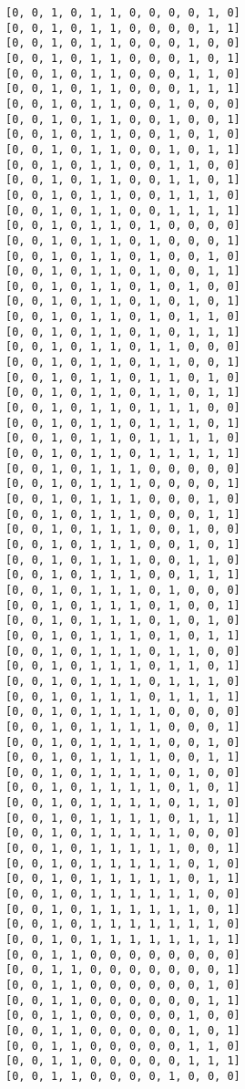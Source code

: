 \documentclass[11pt]{article}
\begin{document}
\begin{Verbatim}[commandchars=\\\{\}]
[0, 0, 1, 0, 1, 1, 0, 0, 0, 0, 1, 0]
[0, 0, 1, 0, 1, 1, 0, 0, 0, 0, 1, 1]
[0, 0, 1, 0, 1, 1, 0, 0, 0, 1, 0, 0]
[0, 0, 1, 0, 1, 1, 0, 0, 0, 1, 0, 1]
[0, 0, 1, 0, 1, 1, 0, 0, 0, 1, 1, 0]
[0, 0, 1, 0, 1, 1, 0, 0, 0, 1, 1, 1]
[0, 0, 1, 0, 1, 1, 0, 0, 1, 0, 0, 0]
[0, 0, 1, 0, 1, 1, 0, 0, 1, 0, 0, 1]
[0, 0, 1, 0, 1, 1, 0, 0, 1, 0, 1, 0]
[0, 0, 1, 0, 1, 1, 0, 0, 1, 0, 1, 1]
[0, 0, 1, 0, 1, 1, 0, 0, 1, 1, 0, 0]
[0, 0, 1, 0, 1, 1, 0, 0, 1, 1, 0, 1]
[0, 0, 1, 0, 1, 1, 0, 0, 1, 1, 1, 0]
[0, 0, 1, 0, 1, 1, 0, 0, 1, 1, 1, 1]
[0, 0, 1, 0, 1, 1, 0, 1, 0, 0, 0, 0]
[0, 0, 1, 0, 1, 1, 0, 1, 0, 0, 0, 1]
[0, 0, 1, 0, 1, 1, 0, 1, 0, 0, 1, 0]
[0, 0, 1, 0, 1, 1, 0, 1, 0, 0, 1, 1]
[0, 0, 1, 0, 1, 1, 0, 1, 0, 1, 0, 0]
[0, 0, 1, 0, 1, 1, 0, 1, 0, 1, 0, 1]
[0, 0, 1, 0, 1, 1, 0, 1, 0, 1, 1, 0]
[0, 0, 1, 0, 1, 1, 0, 1, 0, 1, 1, 1]
[0, 0, 1, 0, 1, 1, 0, 1, 1, 0, 0, 0]
[0, 0, 1, 0, 1, 1, 0, 1, 1, 0, 0, 1]
[0, 0, 1, 0, 1, 1, 0, 1, 1, 0, 1, 0]
[0, 0, 1, 0, 1, 1, 0, 1, 1, 0, 1, 1]
[0, 0, 1, 0, 1, 1, 0, 1, 1, 1, 0, 0]
[0, 0, 1, 0, 1, 1, 0, 1, 1, 1, 0, 1]
[0, 0, 1, 0, 1, 1, 0, 1, 1, 1, 1, 0]
[0, 0, 1, 0, 1, 1, 0, 1, 1, 1, 1, 1]
[0, 0, 1, 0, 1, 1, 1, 0, 0, 0, 0, 0]
[0, 0, 1, 0, 1, 1, 1, 0, 0, 0, 0, 1]
[0, 0, 1, 0, 1, 1, 1, 0, 0, 0, 1, 0]
[0, 0, 1, 0, 1, 1, 1, 0, 0, 0, 1, 1]
[0, 0, 1, 0, 1, 1, 1, 0, 0, 1, 0, 0]
[0, 0, 1, 0, 1, 1, 1, 0, 0, 1, 0, 1]
[0, 0, 1, 0, 1, 1, 1, 0, 0, 1, 1, 0]
[0, 0, 1, 0, 1, 1, 1, 0, 0, 1, 1, 1]
[0, 0, 1, 0, 1, 1, 1, 0, 1, 0, 0, 0]
[0, 0, 1, 0, 1, 1, 1, 0, 1, 0, 0, 1]
[0, 0, 1, 0, 1, 1, 1, 0, 1, 0, 1, 0]
[0, 0, 1, 0, 1, 1, 1, 0, 1, 0, 1, 1]
[0, 0, 1, 0, 1, 1, 1, 0, 1, 1, 0, 0]
[0, 0, 1, 0, 1, 1, 1, 0, 1, 1, 0, 1]
[0, 0, 1, 0, 1, 1, 1, 0, 1, 1, 1, 0]
[0, 0, 1, 0, 1, 1, 1, 0, 1, 1, 1, 1]
[0, 0, 1, 0, 1, 1, 1, 1, 0, 0, 0, 0]
[0, 0, 1, 0, 1, 1, 1, 1, 0, 0, 0, 1]
[0, 0, 1, 0, 1, 1, 1, 1, 0, 0, 1, 0]
[0, 0, 1, 0, 1, 1, 1, 1, 0, 0, 1, 1]
[0, 0, 1, 0, 1, 1, 1, 1, 0, 1, 0, 0]
[0, 0, 1, 0, 1, 1, 1, 1, 0, 1, 0, 1]
[0, 0, 1, 0, 1, 1, 1, 1, 0, 1, 1, 0]
[0, 0, 1, 0, 1, 1, 1, 1, 0, 1, 1, 1]
[0, 0, 1, 0, 1, 1, 1, 1, 1, 0, 0, 0]
[0, 0, 1, 0, 1, 1, 1, 1, 1, 0, 0, 1]
[0, 0, 1, 0, 1, 1, 1, 1, 1, 0, 1, 0]
[0, 0, 1, 0, 1, 1, 1, 1, 1, 0, 1, 1]
[0, 0, 1, 0, 1, 1, 1, 1, 1, 1, 0, 0]
[0, 0, 1, 0, 1, 1, 1, 1, 1, 1, 0, 1]
[0, 0, 1, 0, 1, 1, 1, 1, 1, 1, 1, 0]
[0, 0, 1, 0, 1, 1, 1, 1, 1, 1, 1, 1]
[0, 0, 1, 1, 0, 0, 0, 0, 0, 0, 0, 0]
[0, 0, 1, 1, 0, 0, 0, 0, 0, 0, 0, 1]
[0, 0, 1, 1, 0, 0, 0, 0, 0, 0, 1, 0]
[0, 0, 1, 1, 0, 0, 0, 0, 0, 0, 1, 1]
[0, 0, 1, 1, 0, 0, 0, 0, 0, 1, 0, 0]
[0, 0, 1, 1, 0, 0, 0, 0, 0, 1, 0, 1]
[0, 0, 1, 1, 0, 0, 0, 0, 0, 1, 1, 0]
[0, 0, 1, 1, 0, 0, 0, 0, 0, 1, 1, 1]
[0, 0, 1, 1, 0, 0, 0, 0, 1, 0, 0, 0]

\end{Verbatim}
\end{document}
